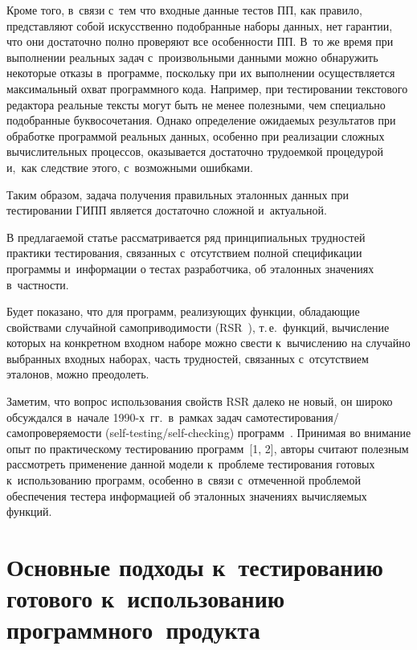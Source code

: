 \begin{multicols}{2}
    Кроме того, в~связи с~тем что входные данные тестов ПП, как правило, 
представляют собой искусственно подобранные наборы данных, нет 
гарантии, что они достаточно полно проверяют все особенности ПП. В~то же 
время при выполнении реальных задач с~произвольными данными можно 
обнаружить некоторые отказы в~программе, поскольку при их выполнении 
осуществляется максимальный охват программного кода. Например, при 
тестировании текстового редактора реальные\linebreak
 тексты могут быть не менее 
полезными, чем специально подобранные буквосочетания. Однако 
определение ожидаемых результатов при обработке\linebreak
 программой реальных 
данных, особенно при реализации сложных вычислительных процессов, 
оказывается достаточно трудоемкой процедурой и,~как следствие этого, 
с~возможными ошибками.
    
    Таким образом, задача получения правильных эталонных данных при 
тестировании ГИПП является достаточно сложной и~актуальной.
    
    В предлагаемой статье рассматривается ряд принципиальных 
трудностей практики тестирования, связанных с~отсутствием полной 
спецификации программы и~информации о тестах разработчика, об 
эталонных значениях в~частности.
    
    Будет показано, что для программ, реа\-ли\-зу\-ющих функции, обладающие 
свойствами случайной самоприводимости 
(RSR~\cite{5-bf}), т.\,е.\ функций, вычисление которых на конкретном 
входном наборе можно свести к~вы\-чис\-ле\-нию на случайно выбранных 
входных наборах, часть трудностей, связанных с~отсутствием эталонов, 
можно преодолеть.
    
    Заметим, что вопрос использования свойств RSR далеко не новый, он 
широко обсуждался в~начале 1990-х~гг.\ в~рамках задач  
са\-мо\-тес\-ти\-ро\-ва\-ния/са\-мо\-про\-ве\-ря\-емости  
(self-testing/self-checking) программ~\cite{6-bf}. Принимая во внимание опыт 
по практическому тестированию программ~[1, 2], авторы считают полезным 
рассмотреть применение данной модели к~проблеме тестирования готовых 
к~использованию программ, особенно в~связи с~отмеченной проблемой 
обеспечения тестера информацией об эталонных значениях вычисляемых 
функций.

\vspace*{-6pt}
    
\section{Основные подходы к~тестированию готового к~использованию программного~продукта}


\end{multicols}
